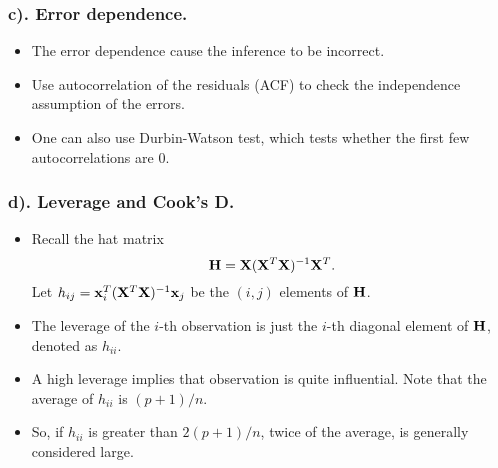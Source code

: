 \documentclass{beamer}
\def\bfX{{\bf X}}
\def\bfx{{\bf x}}
\begin{document}
      \begin{frame}
      	\frametitle{c). Error dependence. }
      	\begin{itemize}
      		
      		\item  The  error  dependence cause  the inference to be incorrect.
      		
      		\item 
      		Use autocorrelation of the residuals (ACF) to check the independence assumption of the errors. 
      		
      		\item One can
      		also use Durbin-Watson test, which tests whether the first few autocorrelations are 0.
      		
      		
      	\end{itemize}
      \end{frame}
      
      \begin{frame}
      	\frametitle{ d). Leverage and Cook's D.}
      	\begin{itemize}
      		
      		\item   Recall the hat matrix
      		$$ {\bf H}= \bfX (\bfX^T\bfX)^{-1} \bfX^T.$$
      		Let $h_{ij}   = \bfx_i^T(\bfX^T\bfX)^{-1} \bfx_j$
      		be the $(i, j)$ elements of ${\bf H}$.
      		\item   
      		The leverage of the $i$-th observation is just the $i$-th diagonal element of ${\bf H}$, denoted
      		as $h_{ii}$.
      		\item A high leverage implies that observation is quite influential.  Note
      		that the average of $h_{ii}$ is $(p+1)/n$.
      		\item   
      		So, if $h_{ii}$ is greater than $2(p+1)/n$, twice of the average, is generally considered large.
      		
      		
      	\end{itemize}
      \end{frame}
      
      
      
\end{document}
